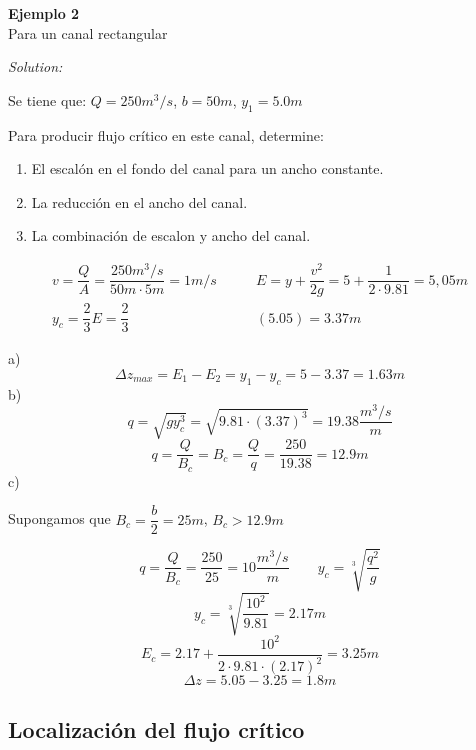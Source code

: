 \documentclass[a4paper, 11pt]{article}
\newenvironment{ejemplo}[2][Ejemplo]
    { \begin{mdframed}[backgroundcolor=gray!20] \textbf{#1 #2} \\}
    {  \end{mdframed}}
\newenvironment{solution}
    {\textit{Solution:}}
    {}
\begin{document}
\begin{ejemplo}{2}

    Para un canal rectangular \vspace{2ex}

    \begin{solution} \vspace{1.5ex}

    Se tiene que: $Q=250m^{3}/s$, $b=50m$, $y_1=5.0m$ \vspace{2ex}

    Para producir flujo crítico en este canal, determine:

    \begin{enumerate}
        \item El escalón en el fondo del canal para un ancho constante.
        \item La reducción en el ancho del canal.
        \item La combinación de escalon y ancho del canal.
    \end{enumerate}

    \begin{equation}
        \begin{aligned}
            v=\dfrac{Q}{A}=\dfrac{250 m^3/s}{50m \cdot 5m}=1m/s \qquad &E=y+\dfrac{v^{2}}{2g}=5+\dfrac{1}{2\cdot9.81}=5,05m\\
            y_{c}=\dfrac{2}{3}E=\dfrac{2}{3}&(5.05)=3.37m
        \end{aligned} 
    \nonumber
    \end{equation}

    a)  $$\Delta z_{max}=E_{1}-E_{2}=y_{1}-y_{c}=5-3.37=1.63m$$
    b)  $$q=\sqrt{gy^{3}_{c}}=\sqrt{9.81\cdot(3.37)^{3}}=19.38\dfrac{m^{3}/s}{m}$$
    $$q=\dfrac{Q}{B_{c}}=B_{c}=\dfrac{Q}{q}=\dfrac{250}{19.38}=12.9m$$
    c) \begin{center}
            Supongamos que $B_{c}=\dfrac{b}{2}=25m$, $B_{c}>12.9m$
        \end{center}
        $$q=\dfrac{Q}{B_{c}}=\dfrac{250}{25}=10\dfrac{m^{3}/s}{m} \qquad y_{c}=\sqrt[3]{\dfrac{q^{2}}{g}}$$
        $$y_{c}=\sqrt[3]{\dfrac{10^{2}}{9.81}}=2.17m$$
        $$E_{c}=2.17+\dfrac{10^{2}}{2\cdot9.81\cdot(2.17)^2}=3.25m$$
        $$\Delta z= 5.05-3.25=1.8m$$
    
    
    \end{solution}

\end{ejemplo}

\subsection{Localización del flujo crítico}
\end{document}
